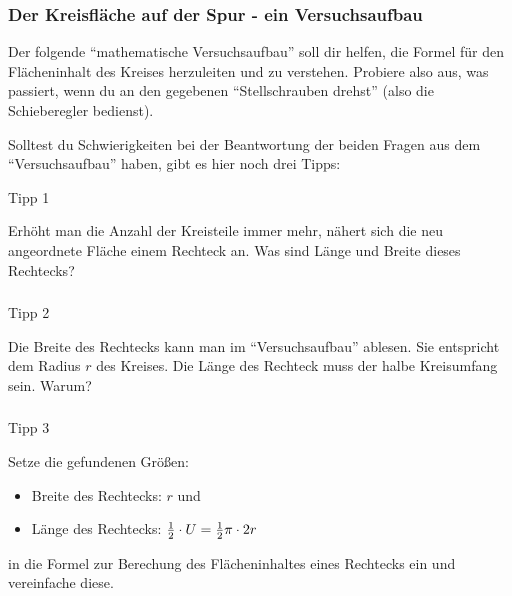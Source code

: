\documentclass[
  ngerman,
]{book}
\providecommand{\tightlist}{%
  \setlength{\itemsep}{0pt}\setlength{\parskip}{0pt}}
\begin{document}
\hypertarget{der-kreisfluxe4che-auf-der-spur---ein-versuchsaufbau}{%
\subsubsection*{Der Kreisfläche auf der Spur - ein Versuchsaufbau}\label{der-kreisfluxe4che-auf-der-spur---ein-versuchsaufbau}}

Der folgende ``mathematische Versuchsaufbau'' soll dir helfen, die Formel für den Flächeninhalt des Kreises herzuleiten und zu verstehen. Probiere also aus, was passiert, wenn du an den gegebenen ``Stellschrauben drehst'' (also die Schieberegler bedienst).

Solltest du Schwierigkeiten bei der Beantwortung der beiden Fragen aus dem ``Versuchsaufbau'' haben, gibt es hier noch drei Tipps:

Tipp 1

Erhöht man die Anzahl der Kreisteile immer mehr, nähert sich die neu angeordnete Fläche einem Rechteck an. Was sind Länge und Breite dieses Rechtecks?

\hypertarget{section-25}{%
\subsubsection*{}\label{section-25}}

Tipp 2

Die Breite des Rechtecks kann man im ``Versuchsaufbau'' ablesen. Sie entspricht dem Radius \(r\) des Kreises. Die Länge des Rechteck muss der halbe Kreisumfang sein. Warum?

\hypertarget{section-26}{%
\subsubsection*{}\label{section-26}}

Tipp 3

Setze die gefundenen Größen:

\begin{itemize}
\tightlist
\item
  Breite des Rechtecks: \(r\) und
\item
  Länge des Rechtecks: \({1 \over 2} \cdot U = {1 \over 2} \pi \cdot 2r\)
\end{itemize}

in die Formel zur Berechung des Flächeninhaltes eines Rechtecks ein und vereinfache diese.
\end{document}
